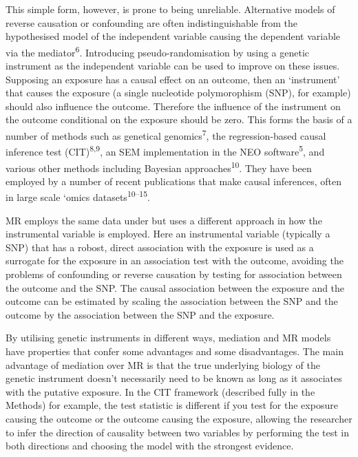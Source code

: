 \documentclass[]{article}
\begin{document}
This simple form, however, is prone to being unreliable. Alternative
models of reverse causation or confounding are often indistinguishable
from the hypothesised model of the independent variable causing the
dependent variable via the mediator\textsuperscript{6}. Introducing
pseudo-randomisation by using a genetic instrument as the independent
variable can be used to improve on these issues. Supposing an exposure
has a causal effect on an outcome, then an `instrument' that causes the
exposure (a single nucleotide polymorophism (SNP), for example) should
also influence the outcome. Therefore the influence of the instrument on
the outcome conditional on the exposure should be zero. This forms the
basis of a number of methods such as genetical
genomics\textsuperscript{7}, the regression-based causal inference test
(CIT)\textsuperscript{8,9}, an SEM implementation in the NEO
software\textsuperscript{5}, and various other methods including
Bayesian approaches\textsuperscript{10}. They have been employed by a
number of recent publications that make causal inferences, often in
large scale `omics datasets\textsuperscript{10--15}.

MR employs the same data under but uses a different approach in how the
instrumental variable is employed. Here an instrumental variable
(typically a SNP) that has a robost, direct association with the
exposure is used as a surrogate for the exposure in an association test
with the outcome, avoiding the problems of confounding or reverse
causation by testing for association between the outcome and the SNP.
The causal association between the exposure and the outcome can be
estimated by scaling the association between the SNP and the outcome by
the association between the SNP and the exposure.

By utilising genetic instruments in different ways, mediation and MR
models have properties that confer some advantages and some
disadvantages. The main advantage of mediation over MR is that the true
underlying biology of the genetic instrument doesn't necessarily need to
be known as long as it associates with the putative exposure. In the CIT
framework (described fully in the Methods) for example, the test
statistic is different if you test for the exposure causing the outcome
or the outcome causing the exposure, allowing the researcher to infer
the direction of causality between two variables by performing the test
in both directions and choosing the model with the strongest evidence.
\end{document}
